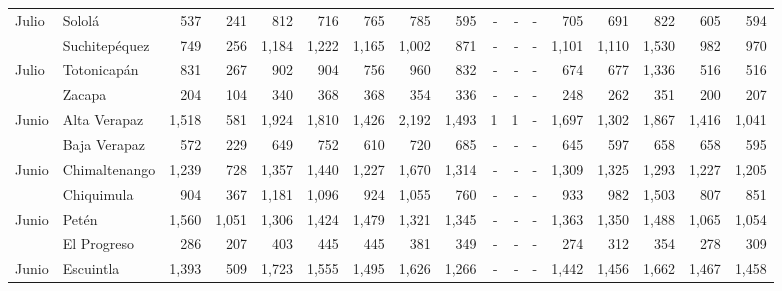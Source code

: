 \begin{landscape}
\begin{center}
\begin{longtable}{llrrrrrrrrrrrrrrr}
			\multicolumn{1}{l}{	\footnotesize	 Julio 	}&	 Sololá 	&	 537 	&	 241 	&	 812 	&	 716 	&	 765 	&	 785 	&	 595 	&	 -   	&	 -   	&	 -   	&	 705 	&	 691 	&	 822 	&	 605 	&	 594 	\\
			\rowcolor{color1!5!white}\multicolumn{1}{l}{	\footnotesize	 Julio 	}&	 Suchitepéquez 	&	 749 	&	 256 	&	 1,184 	&	 1,222 	&	 1,165 	&	 1,002 	&	 871 	&	 -   	&	 -   	&	 -   	&	 1,101 	&	 1,110 	&	 1,530 	&	 982 	&	 970 	\\
			\multicolumn{1}{l}{	\footnotesize	 Julio 	}&	 Totonicapán 	&	 831 	&	 267 	&	 902 	&	 904 	&	 756 	&	 960 	&	 832 	&	 -   	&	 -   	&	 -   	&	 674 	&	 677 	&	 1,336 	&	 516 	&	 516 	\\
			\rowcolor{color1!5!white}\multicolumn{1}{l}{	\footnotesize	 Julio 	}&	 Zacapa 	&	 204 	&	 104 	&	 340 	&	 368 	&	 368 	&	 354 	&	 336 	&	 -   	&	 -   	&	 -   	&	 248 	&	 262 	&	 351 	&	 200 	&	 207 	\\
			\multicolumn{1}{l}{	\footnotesize	 Junio 	}&	 Alta Verapaz 	&	 1,518 	&	 581 	&	 1,924 	&	 1,810 	&	 1,426 	&	 2,192 	&	 1,493 	&	 1 	&	 1 	&	 -   	&	 1,697 	&	 1,302 	&	 1,867 	&	 1,416 	&	 1,041 	\\
			\rowcolor{color1!5!white}\multicolumn{1}{l}{	\footnotesize	 Junio 	}&	 Baja Verapaz 	&	 572 	&	 229 	&	 649 	&	 752 	&	 610 	&	 720 	&	 685 	&	 -   	&	 -   	&	 -   	&	 645 	&	 597 	&	 658 	&	 658 	&	 595 	\\
			\multicolumn{1}{l}{	\footnotesize	 Junio 	}&	 Chimaltenango 	&	 1,239 	&	 728 	&	 1,357 	&	 1,440 	&	 1,227 	&	 1,670 	&	 1,314 	&	 -   	&	 -   	&	 -   	&	 1,309 	&	 1,325 	&	 1,293 	&	 1,227 	&	 1,205 	\\
			\rowcolor{color1!5!white}\multicolumn{1}{l}{	\footnotesize	 Junio 	}&	 Chiquimula 	&	 904 	&	 367 	&	 1,181 	&	 1,096 	&	 924 	&	 1,055 	&	 760 	&	 -   	&	 -   	&	 -   	&	 933 	&	 982 	&	 1,503 	&	 807 	&	 851 	\\
			\multicolumn{1}{l}{	\footnotesize	 Junio 	}&	 Petén 	&	 1,560 	&	 1,051 	&	 1,306 	&	 1,424 	&	 1,479 	&	 1,321 	&	 1,345 	&	 -   	&	 -   	&	 -   	&	 1,363 	&	 1,350 	&	 1,488 	&	 1,065 	&	 1,054 	\\
			\rowcolor{color1!5!white}\multicolumn{1}{l}{	\footnotesize	 Junio 	}&	 El Progreso 	&	 286 	&	 207 	&	 403 	&	 445 	&	 445 	&	 381 	&	 349 	&	 -   	&	 -   	&	 -   	&	 274 	&	 312 	&	 354 	&	 278 	&	 309 	\\
			\multicolumn{1}{l}{	\footnotesize	 Junio 	}&	 Escuintla 	&	 1,393 	&	 509 	&	 1,723 	&	 1,555 	&	 1,495 	&	 1,626 	&	 1,266 	&	 -   	&	 -   	&	 -   	&	 1,442 	&	 1,456 	&	 1,662 	&	 1,467 	&	 1,458 	\\

\end{longtable}
\end{center}
\end{landscape}
